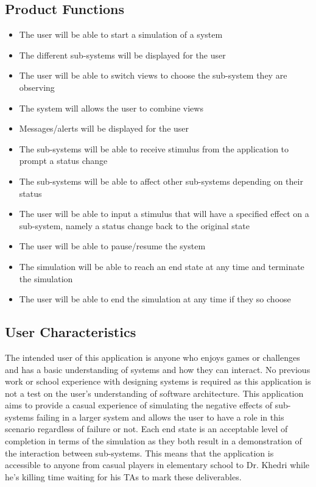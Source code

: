\documentclass[12pt, titlepage]{article}
\newcommand\tab[1][1cm]{\hspace*{#1}}
\begin{document}
\subsection{Product Functions}
\begin{itemize}
\item The user will be able to start a simulation of a system
\item The different sub-systems will be displayed for the user
\item The user will be able to switch views to choose the sub-system they are observing
\item The system will allows the user to combine views
\item Messages/alerts will be displayed for the user
\item The sub-systems will be able to receive stimulus from the application to prompt a status change
\item The sub-systems will be able to affect other sub-systems depending on their status
\item The user will be able to input a stimulus that will have a specified effect on a sub-system, namely a status change back to the original state
\item The user will be able to pause/resume the system
\item The simulation will be able to reach an end state at any time and terminate the simulation
\item The user will be able to end the simulation at any time if they so choose
\end{itemize}

\subsection{User Characteristics}
\tab The intended user of this application is anyone who enjoys games or challenges and has a basic understanding of systems and how they can interact. No previous work or school experience with designing systems is required as this application is not a test on the user's understanding of software architecture. This application aims to provide a casual experience of simulating the negative effects of sub-systems failing in a larger system and allows the user to have a role in this scenario regardless of failure or not. Each end state is an acceptable level of completion in terms of the simulation as they both result in a demonstration of the interaction between sub-systems. This means that the application is accessible to anyone from casual players in elementary school to Dr. Khedri while he's killing time waiting for his TAs to mark these deliverables.
\end{document}
